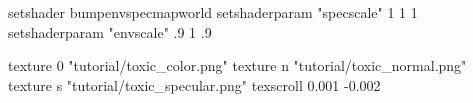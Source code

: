 setshader bumpenvspecmapworld
setshaderparam "specscale" 1 1 1
setshaderparam "envscale" .9 1 .9

texture 0 "tutorial/toxic_color.png"
texture n "tutorial/toxic_normal.png"
texture s "tutorial/toxic_specular.png"
texscroll 0.001 -0.002

